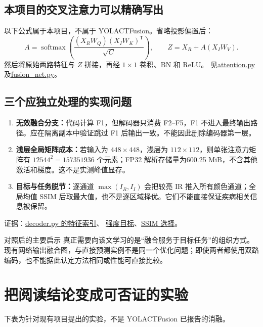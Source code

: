 \documentclass[UTF8,a4paper,11pt,fontset=windows]{ctexart}
\newcommand{\coderef}[2]{\href{https://github.com/Winner-ux/calabration/blob/c61447127faea3625eec9a17ff841c7b249a8d59/#1}{#2}}
\newcommand{\newpagepart}{\clearpage}
\begin{document}
\subsection{本项目的交叉注意力可以精确写出}
以下公式属于本项目，不属于 YOLACTFusion。省略投影偏置后：
\begin{equation}
 A=\operatorname{softmax}\!\left(\frac{(X_RW_Q)(X_IW_K)^{\mathsf T}}{\sqrt C}\right),
 \qquad Z=X_R+A(X_IW_V).
\end{equation}
然后将原始两路特征与 $Z$ 拼接，再经 $1\times1$ 卷积、BN 和 ReLU。
见\coderef{model/attention.py\#L161}{attention.py}及\coderef{model/fusion_net.py\#L65}{fusion\_net.py}。

\subsection{三个应独立处理的实现问题}
\begin{enumerate}
  \item \textbf{无效融合分支：}代码计算 F1，但解码器只消费 F2--F5，F1 不进入最终输出路径。应在隔离副本中验证跳过 F1 后输出一致。不能因此删除编码器第一层。
  \item \textbf{浅层全局矩阵成本：}若输入为 $448\times448$，浅层为 $112\times112$，则单张注意力矩阵有 $12544^2=157351936$ 个元素；FP32 解析存储量为600.25 MiB，不含其他激活和梯度。这不是实测峰值显存。
  \item \textbf{目标与任务脱节：}逐通道 $\max(I_R,I_I)$ 会把较亮 IR 推入所有颜色通道；全局均值 SSIM 后取最大值，也不是逐区域择优。它们不能直接保证疾病相关信息被保留。
\end{enumerate}
\noindent 证据：\coderef{model/decoder.py\#L140}{decoder.py 的特征索引}、
\coderef{main/loss.py\#L367}{强度目标}、\coderef{main/loss.py\#L431}{SSIM 选择}。

\begin{note}{对照后的主要启示}
真正需要向该文学习的是“融合服务于目标任务”的组织方式。现有网络输出融合图，与直接预测实例不是同一个优化问题；即使两者都使用双路编码，也不能据此认定方法相同或性能可直接比较。
\end{note}

\newpagepart
\section{把阅读结论变成可否证的实验}
\noindent 下表为针对现有项目提出的实验，不是 YOLACTFusion 已报告的消融。
\end{document}
